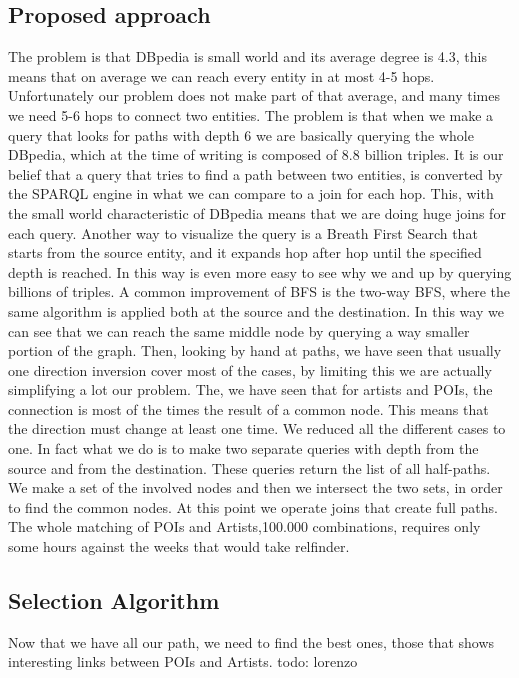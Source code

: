 \subsection{Proposed approach}
The problem is that DBpedia is small world and its average degree is 4.3, this means that on average we can reach every entity in at most 4-5 hops. Unfortunately our problem does not make part of that average, and many times we need 5-6 hops to connect two entities. The problem is that when we make a query that looks for paths with depth 6 we are basically querying the whole DBpedia, which at the time of writing is composed of 8.8 billion triples.
It is our belief that a query that tries to find a path between two entities, is converted by the SPARQL engine in what we can compare to a join for each hop. This, with the small world characteristic of DBpedia means that we are doing huge joins for each query.
Another way to visualize the query is a Breath First Search that starts from the source entity, and it expands hop after hop until the specified depth is reached. In this way is even more easy to see why we and up by querying billions of triples.
A common improvement of BFS is the two-way BFS, where the same algorithm is applied both at the source and the destination. In this way we can see that we can reach the same middle node by querying a way smaller portion of the graph.
Then, looking by hand at paths, we have seen that usually one direction inversion cover most of the cases, by limiting this we are actually simplifying a lot our problem. The, we have seen that for artists and POIs, the connection is most of the times the result of a common node. This means that the direction must change at least one time. We reduced all the different cases to one. In fact what we do is to make two separate queries with depth  from the source and from the destination. These queries return the list of all half-paths. We make a set of the involved nodes and then we intersect the two sets, in order to find the common nodes. At this point we operate joins that create full paths. The whole matching of POIs and Artists,100.000 combinations, requires only some hours against the weeks that would take relfinder.
\subsection{Selection Algorithm}
Now that we have all our path, we need to find the best ones, those that shows interesting links between POIs and Artists.
todo: lorenzo
